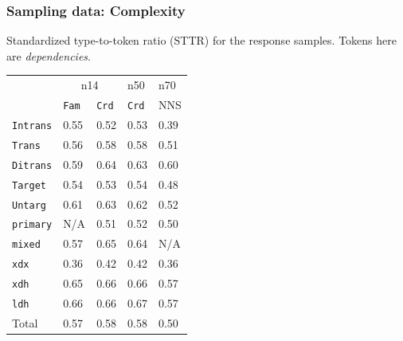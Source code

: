 \documentclass[handout,xcolor={dvipsnames}]{beamer}
\newcommand{\param}[1]{\texttt{#1}}
\begin{document}
\begin{frame}
\frametitle{Sampling data: Complexity}

\small
Standardized type-to-token ratio (STTR) for the response samples. Tokens here are \textit{dependencies}. \\

\begin{table}[htb!]
\begin{center}
\setlength{\tabcolsep}{.5em}
\begin{tabular}{|l||l|l|l||l|}
\hline
 	& \multicolumn{2}{c|}{n14} & n50 & n70 \\
\cline{2-5}
   	& \param{Fam} & \param{Crd} & \param{Crd} 			& NNS			\\ \hline
\hline


\param{Intrans} & 0.55 	  		& 0.52 			& 0.53 		& 0.39 		\\ \hline
\param{Trans}   & 0.56        	& 0.58          & 0.58      & 0.51    	    \\ \hline
\param{Ditrans} & 0.59        	& 0.64          & 0.63      & 0.60    	    \\ \hline
\hline
\param{Target}  & 0.54 			& 0.53	 		& 0.54 		& 0.48			\\ \hline
\param{Untarg}  & 0.61        	& 0.63        	& 0.62    	& 0.52        	\\ \hline
\hline
\param{prim\-a\-ry} & N/A       & 0.51 			& 0.52		& 0.50		 	\\ \hline
\param{mix\-ed}   & 0.57        & 0.65          & 0.64      & N/A	        \\ \hline
\hline
\param{xdx}     & 0.36			& 0.42 			& 0.42		& 0.36			\\ \hline
\param{xdh}     & 0.65        	& 0.66          & 0.66      & 0.57	        \\ \hline
\param{ldh}     & 0.66        	& 0.66          & 0.67      & 0.57	        \\ \hline
\hline
Total    		& 0.57        	& 0.58         	& 0.58    	& 0.50	        \\ \hline

\end{tabular}
\end{center}
\end{table}
\end{frame}
\end{document}
